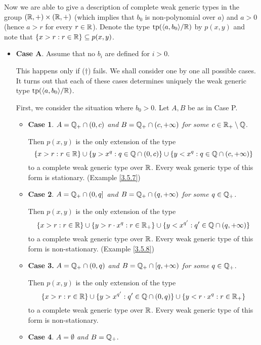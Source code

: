 \documentclass[11pt]{article}
\begin{document}
Now we are able to give a description of complete weak generic types in the
group \((\mathbb{R},+)\times(\mathbb{R},+)\) (which implies that \(b_0\) is non-polynomial over \(a\)) and \(a>0\)
(hence \(a>r\) for every \(r\in\mathbb{R}\)). Denote the type \(\operatorname{tp}(\langle a,b_0\rangle/\mathbb{R})\) by \(p(x,y)\) and note
that \(\{x>r:r\in\mathbb{R}\}\subseteq p(x,y)\).

\begin{itemize}
\item \textbf{Case A}. Assume that no \(b_i\) are defined for \(i>0\).

This happens only if (\(\dagger\)) fails. We
shall consider one by one all possible cases. It turns out that each of these cases determines
uniquely the weak generic type \(\operatorname{tp}(\langle a,b_0\rangle/\mathbb{R})\).

First, we consider the situation where \(b_0>0\). Let \(A,B\) be as in Case P.
\begin{itemize}
\item \textbf{Case 1}. \emph{\(A=\mathbb{Q}_+\cap(0,c)\) and \(B=\mathbb{Q}_+\cap(c,+\infty)\) for some \(c\in\mathbb{R}_+\setminus\mathbb{Q}\)}.

Then \(p(x,y)\) is the only extension of the type
\begin{equation*}
\{x>r:r\in\mathbb{R}\}\cup\{y>x^q:q\in\mathbb{Q}\cap(0,c)\}\cup\{y<x^q:q\in\mathbb{Q}\cap(c,+\infty)\}
\end{equation*}
to a complete weak generic type over \(\mathbb{R}\). Every weak generic type of this form is
stationary. (Example \ref{3.5.7})
\item \textbf{Case 2}. \emph{\(A=\mathbb{Q}_+\cap(0,q]\) and \(B=\mathbb{Q}_+\cap(q,+\infty)\) for some \(q\in\mathbb{Q}_+\).}

Then \(p(x,y)\) is the only extension of the type
\begin{equation*}
\{x>r:r\in\mathbb{R}\}\cup\{y>r\cdot x^q:r\in\mathbb{R}_+\}\cup\{y<x^{q'}:q'\in\mathbb{Q}\cap(q,+\infty)\}
\end{equation*}
to a complete weak generic type over \(\mathbb{R}\). Every weak generic type of this form is
non-stationary. (Example \ref{3.5.8})
\item \textbf{Case 3.} \emph{\(A=\mathbb{Q}_+\cap(0,q)\) and \(B=\mathbb{Q}_+\cap[q,+\infty)\) for some \(q\in\mathbb{Q}_+\)}.

Then \(p(x,y)\) is the only extension of the type
\begin{equation*}
\{x>r:r\in\mathbb{R}\}\cup\{y>x^{q'}:q'\in\mathbb{Q}\cap(0,q)\}\cup\{y<r\cdot x^q:r\in\mathbb{R}_+\}
\end{equation*}
to a complete weak generic type over \(\mathbb{R}\). Every weak generic type of this form is
non-stationary.
\item \textbf{Case 4}. \emph{\(A=\emptyset\) and \(B=\mathbb{Q}_+\)}.


\end{itemize}
\end{itemize}
\end{document}
